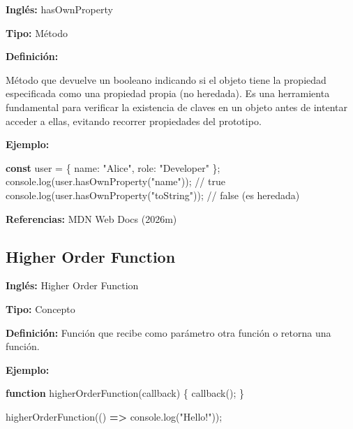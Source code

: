 \documentclass[
  letterpaper,
  DIV=11,
  numbers=noendperiod]{scrreprt}
\newenvironment{Shaded}{\begin{snugshade}}{\end{snugshade}}
\newcommand{\BuiltInTok}[1]{\textcolor[rgb]{0.00,0.23,0.31}{#1}}
\newcommand{\CommentTok}[1]{\textcolor[rgb]{0.37,0.37,0.37}{#1}}
\newcommand{\DataTypeTok}[1]{\textcolor[rgb]{0.68,0.00,0.00}{#1}}
\newcommand{\FunctionTok}[1]{\textcolor[rgb]{0.28,0.35,0.67}{#1}}
\newcommand{\KeywordTok}[1]{\textcolor[rgb]{0.00,0.23,0.31}{\textbf{#1}}}
\newcommand{\NormalTok}[1]{\textcolor[rgb]{0.00,0.23,0.31}{#1}}
\newcommand{\OperatorTok}[1]{\textcolor[rgb]{0.37,0.37,0.37}{#1}}
\newcommand{\StringTok}[1]{\textcolor[rgb]{0.13,0.47,0.30}{#1}}
\let\oldsubsection\subsection
\renewcommand{\subsection}{\phantomsection\oldsubsection}
\begin{document}
\textbf{Inglés:} hasOwnProperty

\textbf{Tipo:} Método

\textbf{Definición:}

Método que devuelve un booleano indicando si el objeto tiene la
propiedad especificada como una propiedad propia (no heredada). Es una
herramienta fundamental para verificar la existencia de claves en un
objeto antes de intentar acceder a ellas, evitando recorrer propiedades
del prototipo.

\textbf{Ejemplo:}

\begin{Shaded}
\begin{Highlighting}[]
\KeywordTok{const}\NormalTok{ user }\OperatorTok{=}\NormalTok{ \{ }\DataTypeTok{name}\OperatorTok{:} \StringTok{"Alice"}\OperatorTok{,} \DataTypeTok{role}\OperatorTok{:} \StringTok{"Developer"}\NormalTok{ \}}\OperatorTok{;}
\BuiltInTok{console}\OperatorTok{.}\FunctionTok{log}\NormalTok{(user}\OperatorTok{.}\FunctionTok{hasOwnProperty}\NormalTok{(}\StringTok{"name"}\NormalTok{))}\OperatorTok{;} \CommentTok{// true}
\BuiltInTok{console}\OperatorTok{.}\FunctionTok{log}\NormalTok{(user}\OperatorTok{.}\FunctionTok{hasOwnProperty}\NormalTok{(}\StringTok{"toString"}\NormalTok{))}\OperatorTok{;} \CommentTok{// false (es heredada)}
\end{Highlighting}
\end{Shaded}

\textbf{Referencias:} MDN Web Docs (2026m)

\subsection*{Higher Order Function}\label{glos-higher_order_function}

\textbf{Inglés:} Higher Order Function

\textbf{Tipo:} Concepto

\textbf{Definición:} Función que recibe como parámetro otra función o
retorna una función.

\textbf{Ejemplo:}

\begin{Shaded}
\begin{Highlighting}[]
\KeywordTok{function} \FunctionTok{higherOrderFunction}\NormalTok{(callback) \{}
  \FunctionTok{callback}\NormalTok{()}\OperatorTok{;}
\NormalTok{\}}

\FunctionTok{higherOrderFunction}\NormalTok{(() }\KeywordTok{=\textgreater{}} \BuiltInTok{console}\OperatorTok{.}\FunctionTok{log}\NormalTok{(}\StringTok{"Hello!"}\NormalTok{))}\OperatorTok{;}
\end{Highlighting}
\end{Shaded}
\end{document}
